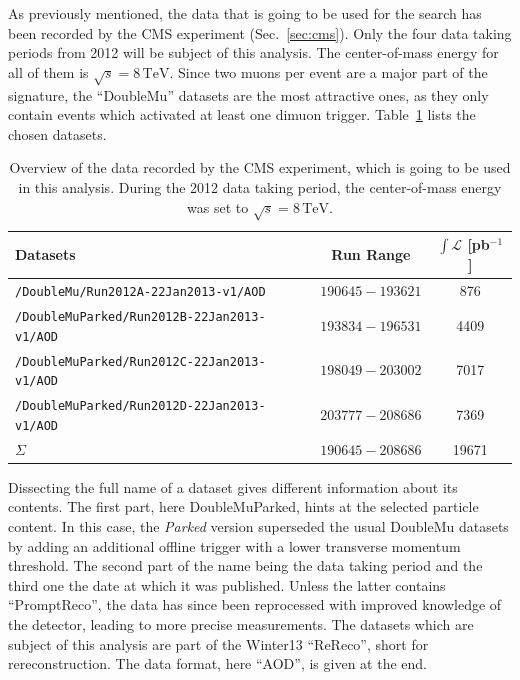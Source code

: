 As previously mentioned, the data that is going to be used for the search has been recorded by the CMS experiment (Sec.~\ref{sec:cms}). Only the four data taking periods from 2012 will be subject of this analysis. The center-of-mass energy for all of them is $\sqrt{s} = 8\,\text{TeV}$. Since two muons per event are a major part of the signature, the ``DoubleMu'' datasets are the most attractive ones, as they only contain events which activated at least one dimuon trigger. Table~\ref{tab:data} lists the chosen datasets.

\begin{table}[!ht]
  \centering
  \begin{tabular}{|l|c|c|}
    \hline
    Datasets                                         & Run Range         & $\int \mathcal{L}$ [pb$^{-1}$] \\ \hline \hline
    \verb+/DoubleMu/Run2012A-22Jan2013-v1/AOD+       & $190645 - 193621$ & 876                            \\ \hline
    \verb+/DoubleMuParked/Run2012B-22Jan2013-v1/AOD+ & $193834 - 196531$ & 4409                           \\ \hline
    \verb+/DoubleMuParked/Run2012C-22Jan2013-v1/AOD+ & $198049 - 203002$ & 7017                           \\ \hline
    \verb+/DoubleMuParked/Run2012D-22Jan2013-v1/AOD+ & $203777 - 208686$ & 7369                           \\ \hline
    $\Sigma$                                         & $190645 - 208686$ & 19671                          \\ \hline
  \end{tabular}
  \caption{Overview of the data recorded by the CMS experiment, which is going to be used in this analysis. During the 2012 data taking period\protect\footnotemark, the center-of-mass energy was set to $\sqrt{s} = 8\,\text{TeV}$.}
  \label{tab:data}
\end{table}


Dissecting the full name of a dataset gives different information about its contents. The first part, here DoubleMuParked, hints at the selected particle content. In this case, the \textit{Parked} version superseded the usual DoubleMu datasets by adding an additional offline trigger with a lower transverse momentum threshold. The second part of the name being the data taking period and the third one the date at which it was published. Unless the latter contains ``PromptReco'', the data has since been reprocessed with improved knowledge of the detector, leading to more precise measurements. The datasets which are subject of this analysis are part of the Winter13 ``ReReco'', short for rereconstruction. The data format, here ``AOD'', is given at the end.

